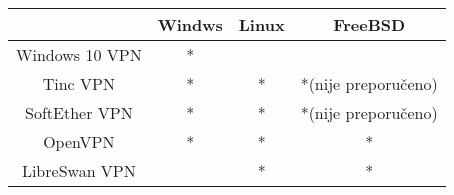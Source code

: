 \begin{center}
\begin{tabular}{c | c | c | c }
	 & \textbf{Windws} & \textbf{Linux} & \textbf{FreeBSD} \\
	 \hline

	Windows 10 VPN & * & &  \\
	\hline
        Tinc VPN & * & * & *(nije preporučeno)  \\
	\hline
	SoftEther VPN & * & * & *(nije preporučeno) \\
	\hline
	OpenVPN & * & * & *  \\
	\hline
	LibreSwan VPN & & *  & * \\
\end{tabular}
\end{center}
